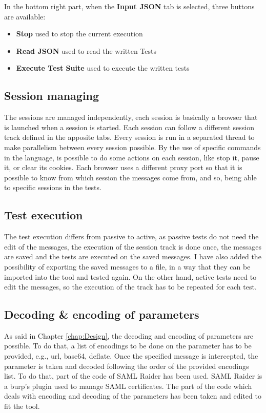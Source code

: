 In the bottom right part, when the \textbf{Input JSON} tab is selected, three buttons are available:
\begin{itemize}
    \item \textbf{Stop} used to stop the current execution
    \item \textbf{Read JSON} used to read the written Tests
    \item \textbf{Execute Test Suite} used to execute the written tests
\end{itemize}

\subsection{Session managing}
The sessions are managed independently, each session is basically a browser that is launched when a session is started. Each session can follow a different \gls{session track} defined in the apposite tabs. Every session is run in a separated thread to make parallelism between every session possible. By the use of specific commands in the language, is possible to do some actions on each session, like stop it, pause it, or clear its cookies. Each browser uses a different proxy port so that it is possible to know from which session the messages come from, and so, being able to specific sessions in the tests.

\subsection{Test execution}
The test execution differs from passive to active, as passive tests do not need the edit of the messages, the execution of the \gls{session track} is done once, the messages are saved and the tests are executed on the saved messages. I have also added the possibility of exporting the saved messages to a file, in a way that they can be imported into the tool and tested again.
On the other hand, active tests need to edit the messages, so the execution of the track has to be repeated for each test.

\subsection{Decoding \& encoding of parameters}
As said in Chapter \ref{chap:Design}, the decoding and encoding of parameters are possible. To do that, a list of encodings to be done on the parameter has to be provided, e.g., url, base64, deflate. Once the specified message is intercepted, the parameter is taken and decoded following the order of the provided encodings list. To do that, part of the code of SAML Raider \cite{saml_raider} has been used. SAML Raider is a \Gls{burp}'s plugin used to manage \Gls{SAML} certificates. The part of the code which deals with encoding and decoding of the parameters has been taken and edited to fit the tool.

